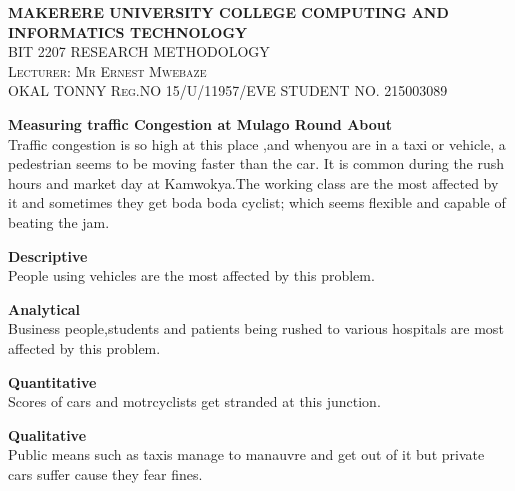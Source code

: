\documentclass{article}
\begin{document}
\begin{titlepage}
\begin{center}
\huge{\bfseries MAKERERE UNIVERSITY COLLEGE COMPUTING AND INFORMATICS TECHNOLOGY }\\
[1in]
\textsc{\LARGE BIT 2207 RESEARCH METHODOLOGY\\
Lecturer: Mr Ernest Mwebaze}\\
[0.5cm]
\textsc{\LARGE OKAL TONNY 
Reg.NO 15/U/11957/EVE
 STUDENT NO. 215003089}\\
\end{center}
\end{titlepage}
\huge{\bfseries Measuring traffic Congestion at Mulago Round About}\\
[1cm]
Traffic congestion is so high at this place ,and whenyou are in a taxi or vehicle, a pedestrian seems to be moving faster than the car. It is common during the rush hours and market day at Kamwokya.The working class are the most affected 
by it and sometimes they get boda boda cyclist; which seems flexible and capable of beating the jam.

\huge{\bfseries Descriptive}\\
People using vehicles are the most affected by this problem.

\huge{\bfseries Analytical}\\
Business people,students and patients being rushed to various hospitals are most affected by this problem.

\huge{\bfseries Quantitative}\\
Scores of cars and motrcyclists get stranded at this junction. 

\huge{\bfseries Qualitative}\\
Public means such as taxis manage to manauvre and get out of it but private cars suffer cause they fear fines. 
\end{document}
